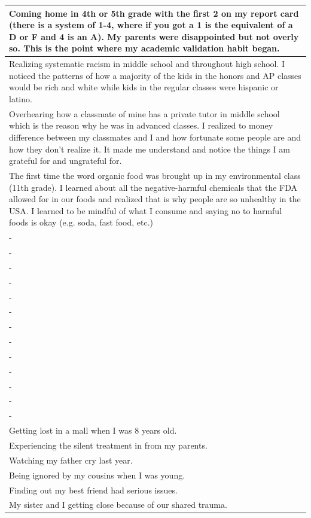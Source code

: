 \documentclass[
  .7em,
  letterpaper,
  DIV=11,
  numbers=noendperiod]{scrartcl}
\begin{document}
\begin{table}
\begin{tabular}{l}
\hline
Coming home in 4th or 5th grade with the first 2 on my report card (there is a system of 1-4, where if you got a 1 is the equivalent of a D or F and 4 is an A). My parents were disappointed but not overly so. This is the point where my academic validation habit began.\\
\hline
Realizing systematic racism in middle school and throughout high school. I noticed the patterns of how a majority of the kids in the honors and AP classes would be rich and white while kids in the regular classes were hispanic or latino.\\
\hline
Overhearing how a classmate of mine has a private tutor in middle school which is the reason why he was in advanced classes. I realized to money difference between my classmates and I and how fortunate some people are and how they don't realize it. It made me understand and notice the things I am grateful for and ungrateful for.\\
\hline
The first time the word organic food was brought up in my environmental class (11th grade). I learned about all the negative-harmful chemicals that the FDA allowed for in our foods and realized that is why people are so unhealthy in the USA. I learned to be mindful of what I consume and saying no to harmful foods is okay (e.g. soda, fast food, etc.)\\
\hline
-\\
\hline
-\\
\hline
-\\
\hline
-\\
\hline
-\\
\hline
-\\
\hline
-\\
\hline
-\\
\hline
-\\
\hline
-\\
\hline
-\\
\hline
-\\
\hline
-\\
\hline
Getting lost in a mall when I was 8 years old.\\
\hline
Experiencing the silent treatment in from my parents.\\
\hline
Watching my father cry last year.\\
\hline
Being ignored by my cousins when I was young.\\
\hline
Finding out my best friend had serious issues.\\
\hline
My sister and I getting close because of our shared trauma.\\

\end{tabular}
\end{table}
\end{document}
